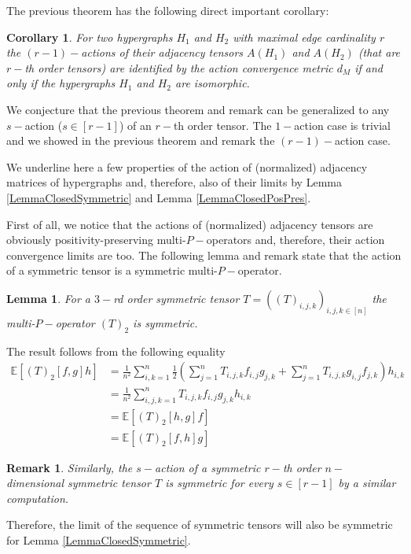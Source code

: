 \documentclass[11pt]{article}
\newtheorem{corollary}{Corollary}[theorem]
\newtheorem{lemma}[theorem]{Lemma}
\newtheorem{remark}[theorem]{Remark}
\begin{document}
The previous theorem has the following direct important corollary:

\begin{corollary}
For two hypergraphs $H_1$ and $H_2$ with maximal edge cardinality $r$ the $(r-1)-$actions of their adjacency tensors $A(H_1)$ and $A(H_2)$ (that are $r-$th order tensors) are identified by the action convergence metric $d_M$ if and only if the hypergraphs $H_1$ and $H_2$ are isomorphic.
\end{corollary}

We conjecture that the previous theorem and remark can be generalized to any $s-$action ($s\in [r-1]$) of an $r-$th order tensor. The $1-$action case is trivial and we showed in the previous theorem and remark the $(r-1)-$action case.

We underline here a few properties of the action of (normalized) adjacency matrices of hypergraphs and, therefore, also of their limits by Lemma \ref{LemmaClosedSymmetric} and Lemma \ref{LemmaClosedPosPres}. 

First of all, we notice that the actions of (normalized) adjacency tensors are obviously positivity-preserving multi-$P-$operators and, therefore, their action convergence limits are too.
The following lemma and remark state that the action of a symmetric tensor is a symmetric multi-$P-$operator. 
\begin{lemma}
For a $3-$rd order symmetric tensor $T=((T)_{i,j,k})_{i,j,k\in [n]}$ the multi-$P-$operator $(T)_2$ is symmetric. 
\end{lemma}
\proof
The result follows from the following equality
\begin{equation}
\begin{aligned}
\mathbb{E}[(T)_2[f,g]h]&=\frac{1}{n^2}\sum^n_{i,k=1}\frac{1}{2}(\sum^n_{j=1}T_{i,j,k}f_{i,j}g_{j,k}+\sum^n_{j=1}T_{i,j,k}g_{i,j}f_{j,k})h_{i,k}\\
&=\frac{1}{n^2}\sum^n_{i,j,k=1}T_{i,j,k}f_{i,j}g_{j,k}h_{i,k}\\
&=\mathbb{E}[(T)_2[h,g]f]\\
&=\mathbb{E}[(T)_2[f,h]g]
\end{aligned}
\end{equation}
\endproof
\begin{remark}
Similarly, the $s-$action of a symmetric $r-$th order $n-$dimensional symmetric tensor $T$ is symmetric for every $s\in [r-1]$ by a similar computation.
\end{remark}

Therefore, the limit of the sequence of symmetric tensors will also be symmetric for Lemma \ref{LemmaClosedSymmetric}.
\end{document}
